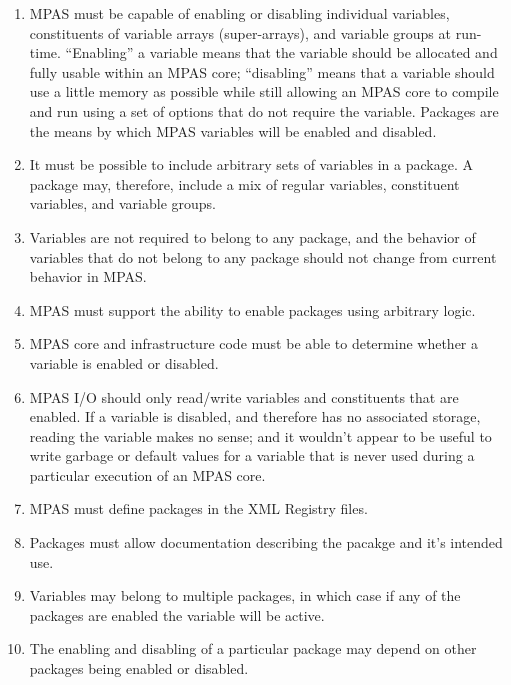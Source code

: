 \documentclass[11pt]{report}
\begin{document}
\begin{enumerate}

\item MPAS must be capable of enabling or disabling individual variables, 
   constituents of variable arrays (super-arrays), and variable groups at run-time.
   ``Enabling'' a variable means that the variable should be allocated and fully usable within
   an MPAS core; ``disabling'' means that a variable should use a little memory as possible 
   while still allowing an MPAS core to compile and run using a set of options that do not 
   require the variable. Packages are the means by which MPAS variables will be
   enabled and disabled.
   
\item It must be possible to include arbitrary sets of variables in a package. A package may, therefore,
   include a mix of regular variables, constituent variables, and variable groups. 

\item Variables are not required to belong to any package, and the behavior of variables that do
   not belong to any package should not change from current behavior in MPAS.
                                                                                                    
\item MPAS must support the ability to enable packages using arbitrary logic.

\item MPAS core and infrastructure code must be able to determine whether a variable is
   enabled or disabled.
   
\item MPAS I/O should only read/write variables and constituents that are enabled. If a variable
   is disabled, and therefore has no associated storage, reading the variable makes no sense; and
   it wouldn't appear to be useful to write garbage or default values for a variable that is never used
   during a particular execution of an MPAS core.

\item MPAS must define packages in the XML Registry files.

\item Packages must allow documentation describing the pacakge and it's intended use.


\item Variables may belong to multiple packages, in which case if any of the packages are enabled the variable will be active.

\item The enabling and disabling of a particular package may depend on other packages being enabled or disabled.

\end{enumerate}                                                             
\end{document}
